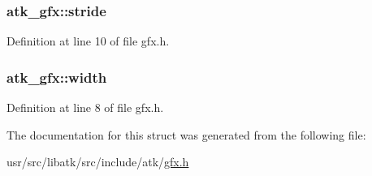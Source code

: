 \hypertarget{structatk__gfx_a7f050db1e3d134473b2077ab5275b727}{
\subsubsection[{stride}]{ atk\+\_\+gfx\+::stride}}\label{structatk__gfx_a7f050db1e3d134473b2077ab5275b727}


Definition at line 10 of file gfx.\+h.

\hypertarget{structatk__gfx_a8c8d73df98a82572a666824b52b99964}{
\subsubsection[{width}]{ atk\+\_\+gfx\+::width}}\label{structatk__gfx_a8c8d73df98a82572a666824b52b99964}


Definition at line 8 of file gfx.\+h.



The documentation for this struct was generated from the following file\+:\begin{DoxyCompactItemize}
\item 
usr/src/libatk/src/include/atk/\hyperlink{gfx_8h}{gfx.\+h}\end{DoxyCompactItemize}
